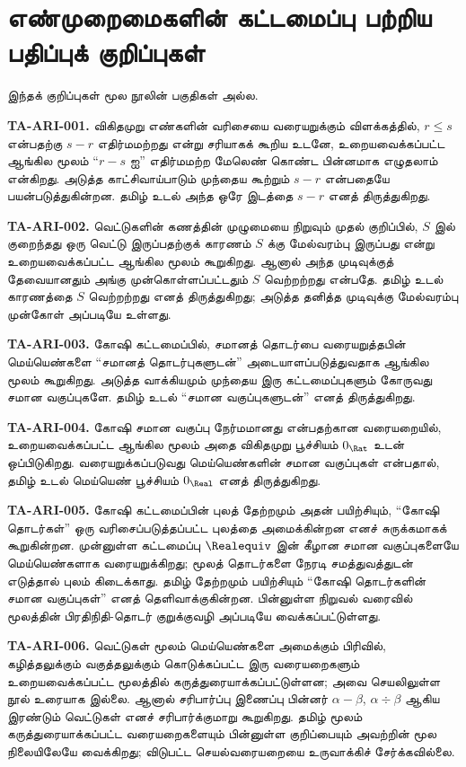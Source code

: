 \section*{எண்முறைமைகளின் கட்டமைப்பு பற்றிய பதிப்புக் குறிப்புகள்}
இந்தக் குறிப்புகள் மூல நூலின் பகுதிகள் அல்ல.

\textbf{TA-ARI-001.} விகிதமுறு எண்களின் வரிசையை வரையறுக்கும்
விளக்கத்தில், $r\leq s$ என்பதற்கு $s-r$ எதிர்மமற்றது என்று சரியாகக்
கூறிய உடனே, உறையவைக்கப்பட்ட ஆங்கில மூலம் ``$r-s$ ஐ''
எதிர்மமற்ற மேலெண் கொண்ட பின்னமாக எழுதலாம் என்கிறது.
அடுத்த காட்சிவாய்பாடும் முந்தைய கூற்றும் $s-r$ என்பதையே பயன்படுத்துகின்றன.
தமிழ் உடல் அந்த ஒரே இடத்தை $s-r$ எனத் திருத்துகிறது.

\textbf{TA-ARI-002.} வெட்டுகளின் கணத்தின் முழுமையை நிறுவும்
முதல் குறிப்பில், $S$ இல் குறைந்தது ஒரு வெட்டு இருப்பதற்குக் காரணம்
$S$ க்கு மேல்வரம்பு இருப்பது என்று உறையவைக்கப்பட்ட ஆங்கில மூலம்
கூறுகிறது. ஆனால் அந்த முடிவுக்குத் தேவையானதும் அங்கு முன்கொள்ளப்பட்டதும்
$S$ வெற்றற்றது என்பதே. தமிழ் உடல் காரணத்தை $S$ வெற்றற்றது எனத்
திருத்துகிறது; அடுத்த தனித்த முடிவுக்கு மேல்வரம்பு முன்கோள் அப்படியே உள்ளது.

\textbf{TA-ARI-003.} கோஷி கட்டமைப்பில், சமானத் தொடர்பை
வரையறுத்தபின் மெய்யெண்களை ``சமானத் தொடர்புகளுடன்'' அடையாளப்படுத்துவதாக
ஆங்கில மூலம் கூறுகிறது. அடுத்த வாக்கியமும் முந்தைய இரு கட்டமைப்புகளும்
கோருவது சமான வகுப்புகளே. தமிழ் உடல் ``சமான வகுப்புகளுடன்'' எனத்
திருத்துகிறது.

\textbf{TA-ARI-004.} கோஷி சமான வகுப்பு நேர்மமானது என்பதற்கான
வரையறையில், உறையவைக்கப்பட்ட ஆங்கில மூலம் அதை விகிதமுறு பூச்சியம்
$0_\Rat$ உடன் ஒப்பிடுகிறது. வரையறுக்கப்படுவது மெய்யெண்களின்
சமான வகுப்புகள் என்பதால், தமிழ் உடல் மெய்யெண் பூச்சியம் $0_\Real$
எனத் திருத்துகிறது.

\textbf{TA-ARI-005.} கோஷி கட்டமைப்பின் புலத் தேற்றமும் அதன்
பயிற்சியும், ``கோஷி தொடர்கள்'' ஒரு வரிசைப்படுத்தப்பட்ட புலத்தை
அமைக்கின்றன எனச் சுருக்கமாகக் கூறுகின்றன.
முன்னுள்ள கட்டமைப்பு $\Realequiv$ இன் கீழான சமான வகுப்புகளையே
மெய்யெண்களாக வரையறுக்கிறது; மூலத் தொடர்களை நேரடி சமத்துவத்துடன்
எடுத்தால் புலம் கிடைக்காது. தமிழ் தேற்றமும் பயிற்சியும்
``கோஷி தொடர்களின் சமான வகுப்புகள்'' எனத் தெளிவாக்குகின்றன.
பின்னுள்ள நிறுவல் வரைவில் மூலத்தின் பிரதிநிதி-தொடர் குறுக்குவழி
அப்படியே வைக்கப்பட்டுள்ளது.

\textbf{TA-ARI-006.} வெட்டுகள் மூலம் மெய்யெண்களை அமைக்கும் பிரிவில்,
கழித்தலுக்கும் வகுத்தலுக்கும் கொடுக்கப்பட்ட இரு வரையறைகளும்
உறையவைக்கப்பட்ட மூலத்தில் கருத்துரையாக்கப்பட்டுள்ளன; அவை செயலிலுள்ள
நூல் உரையாக இல்லை. ஆனால் சரிபார்ப்பு இணைப்பு பின்னர்
$\alpha-\beta$, $\alpha\div\beta$ ஆகிய இரண்டும் வெட்டுகள் எனச்
சரிபார்க்குமாறு கூறுகிறது. தமிழ் மூலம் கருத்துரையாக்கப்பட்ட வரையறைகளையும்
பின்னுள்ள குறிப்பையும் அவற்றின் மூல நிலையிலேயே வைக்கிறது;
விடுபட்ட செயல்வரையறையை உருவாக்கிச் சேர்க்கவில்லை.
